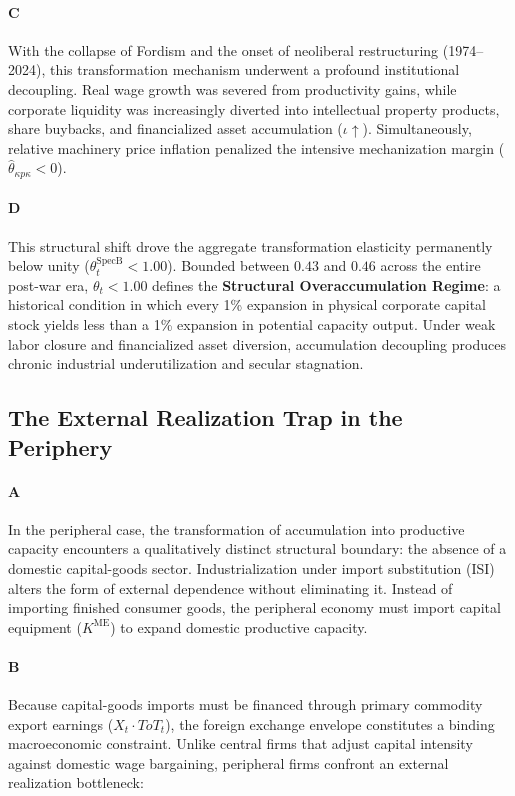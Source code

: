 \paragraph{C}
With the collapse of Fordism and the onset of neoliberal restructuring (1974–2024), this transformation mechanism underwent a profound institutional decoupling. Real wage growth was severed from productivity gains, while corporate liquidity was increasingly diverted into intellectual property products, share buybacks, and financialized asset accumulation ($\iota \uparrow$). Simultaneously, relative machinery price inflation penalized the intensive mechanization margin ($\hat{\theta}_{\kappa p\kappa} < 0$).

\paragraph{D}
This structural shift drove the aggregate transformation elasticity permanently below unity ($\theta_t^{\text{SpecB}} < 1.00$). Bounded between $0.43$ and $0.46$ across the entire post-war era, $\theta_t < 1.00$ defines the \textbf{Structural Overaccumulation Regime}: a historical condition in which every 1\% expansion in physical corporate capital stock yields less than a 1\% expansion in potential capacity output. Under weak labor closure and financialized asset diversion, accumulation decoupling produces chronic industrial underutilization and secular stagnation.

\subsection{The External Realization Trap in the Periphery}

\paragraph{A}
In the peripheral case, the transformation of accumulation into productive capacity encounters a qualitatively distinct structural boundary: the absence of a domestic capital-goods sector. Industrialization under import substitution (ISI) alters the form of external dependence without eliminating it. Instead of importing finished consumer goods, the peripheral economy must import capital equipment ($K^{\text{ME}}$) to expand domestic productive capacity.

\paragraph{B}
Because capital-goods imports must be financed through primary commodity export earnings ($X_t \cdot ToT_t$), the foreign exchange envelope constitutes a binding macroeconomic constraint. Unlike central firms that adjust capital intensity against domestic wage bargaining, peripheral firms confront an external realization bottleneck:

